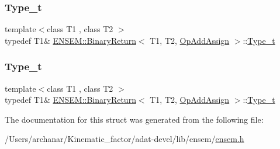 \mbox{\label{structENSEM_1_1BinaryReturn_3_01T1_00_01T2_00_01OpAddAssign_01_4_a6d1b6a141221e93d9b7af97762049ec0}} 
\subsubsection{\texorpdfstring{Type\_t}{Type\_t}\hspace{0.1cm}{\footnotesize\ttfamily [2/3]}}
{\footnotesize\ttfamily template$<$class T1 , class T2 $>$ \\
typedef T1\& \mbox{\hyperlink{structENSEM_1_1BinaryReturn}{E\+N\+S\+E\+M\+::\+Binary\+Return}}$<$ T1, T2, \mbox{\hyperlink{structENSEM_1_1OpAddAssign}{Op\+Add\+Assign}} $>$\+::\mbox{\hyperlink{structENSEM_1_1BinaryReturn_3_01T1_00_01T2_00_01OpAddAssign_01_4_a6d1b6a141221e93d9b7af97762049ec0}{Type\+\_\+t}}}

\mbox{\label{structENSEM_1_1BinaryReturn_3_01T1_00_01T2_00_01OpAddAssign_01_4_a6d1b6a141221e93d9b7af97762049ec0}} 
\subsubsection{\texorpdfstring{Type\_t}{Type\_t}\hspace{0.1cm}{\footnotesize\ttfamily [3/3]}}
{\footnotesize\ttfamily template$<$class T1 , class T2 $>$ \\
typedef T1\& \mbox{\hyperlink{structENSEM_1_1BinaryReturn}{E\+N\+S\+E\+M\+::\+Binary\+Return}}$<$ T1, T2, \mbox{\hyperlink{structENSEM_1_1OpAddAssign}{Op\+Add\+Assign}} $>$\+::\mbox{\hyperlink{structENSEM_1_1BinaryReturn_3_01T1_00_01T2_00_01OpAddAssign_01_4_a6d1b6a141221e93d9b7af97762049ec0}{Type\+\_\+t}}}



The documentation for this struct was generated from the following file\+:\begin{DoxyCompactItemize}
\item 
/\+Users/archanar/\+Kinematic\+\_\+factor/adat-\/devel/lib/ensem/\mbox{\hyperlink{adat-devel_2lib_2ensem_2ensem_8h}{ensem.\+h}}\end{DoxyCompactItemize}
